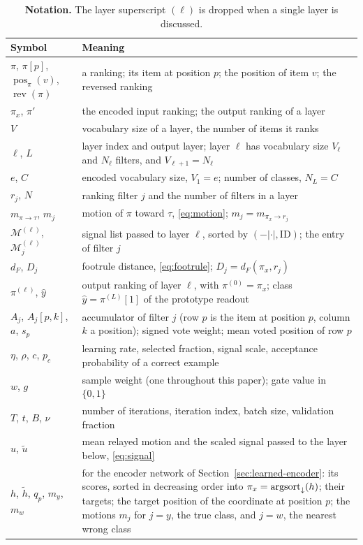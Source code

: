 \begin{table}[!htbp]
\caption{\textbf{Notation.} The layer superscript $(\ell)$ is dropped when a single layer is discussed.}
\label{tab:notation}
\centering
\small
\begin{tabular}{@{}l p{}@{}}
\toprule
Symbol & Meaning \\
\midrule
$\pi$, $\pi[p]$, $\operatorname{pos}_\pi(v)$, $\operatorname{rev}(\pi)$ & a ranking; its item at position $p$; the position of item $v$; the reversed ranking \\
$\pi_x$, $\pi'$ & the encoded input ranking; the output ranking of a layer \\
$V$ & vocabulary size of a layer, the number of items it ranks \\
$\ell$, $L$ & layer index and output layer; layer $\ell$ has vocabulary size $V_\ell$ and $N_\ell$ filters, and $V_{\ell+1}=N_\ell$ \\
$e$, $C$ & encoded vocabulary size, $V_1=e$; number of classes, $N_L=C$ \\
$r_j$, $N$ & ranking filter $j$ and the number of filters in a layer \\
$m_{\pi\to\tau}$, $m_j$ & motion of $\pi$ toward $\tau$, \eqref{eq:motion}; $m_j=m_{\pi_x\to r_j}$ \\
$\mathcal{M}^{(\ell)}$, $\mathcal{M}^{(\ell)}_j$ & signal list passed to layer $\ell$, sorted by $(-|\cdot|,\mathrm{ID})$; the entry of filter $j$ \\
$d_F$, $D_j$ & footrule distance, \eqref{eq:footrule}; $D_j=d_F(\pi_x,r_j)$ \\
$\pi^{(\ell)}$, $\hat y$ & output ranking of layer $\ell$, with $\pi^{(0)}=\pi_x$; class $\hat y=\pi^{(L)}[1]$ of the prototype readout \\
$A_j$, $A_j[p,k]$, $a$, $s_p$ & accumulator of filter $j$ (row $p$ is the item at position $p$, column $k$ a position); signed vote weight; mean voted position of row $p$ \\
$\eta$, $\rho$, $c$, $p_c$ & learning rate, selected fraction, signal scale, acceptance probability of a correct example \\
$w$, $g$ & sample weight (one throughout this paper); gate value in $\{0,1\}$ \\
$T$, $t$, $B$, $\nu$ & number of iterations, iteration index, batch size, validation fraction \\
$u$, $\tilde u$ & mean relayed motion and the scaled signal passed to the layer below, \eqref{eq:signal} \\
$h$, $\tilde h$, $q_p$, $m_y$, $m_w$ & for the encoder network of Section~\ref{sec:learned-encoder}: its scores, sorted in decreasing order into $\pi_x=\mathrm{argsort}_{\downarrow}(h)$; their targets; the target position of the coordinate at position $p$; the motions $m_j$ for $j=y$, the true class, and $j=w$, the nearest wrong class \\
\bottomrule
\end{tabular}
\end{table}

